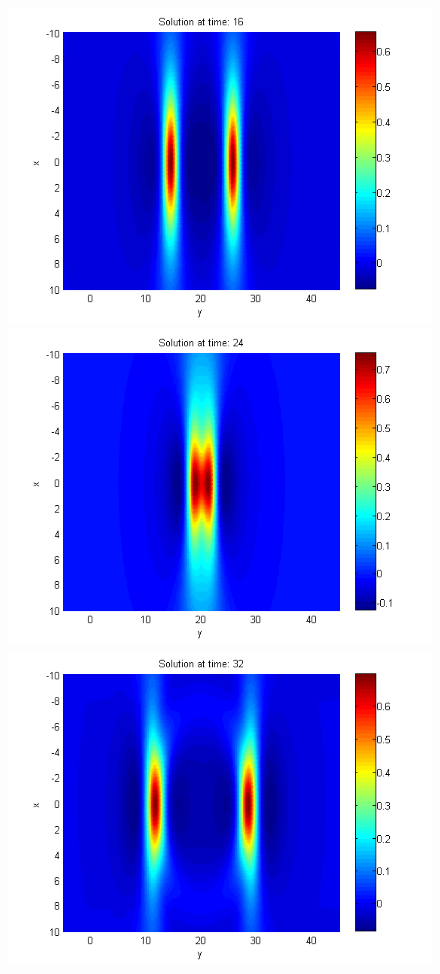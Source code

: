 \documentclass[11pt,a4paper,twoside]{article}
\begin{document}
\begin{figure}[!htbp]
\begin{minipage}[b]{0.31\linewidth}
		 \includegraphics[width=\linewidth]{Pictures/Solution2_t=16.png}
	\end{minipage}
	\begin{minipage}[b]{0.31\linewidth}
		\includegraphics[width=\linewidth]{Pictures/Solution2_t=24.png}
	\end{minipage}	
	\begin{minipage}[b]{0.31\linewidth}
		 \includegraphics[width=\linewidth]{Pictures/Solution2_t=32.png}

\end{minipage}
\end{figure}
\end{document}
